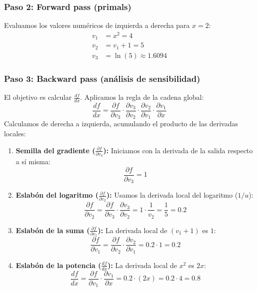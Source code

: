 \documentclass[12pt,a4paper,openany,oneside]{book}
\begin{document}
\begin{center}
\end{center}

\subsubsection{Paso 2: Forward pass (primals)}
Evaluamos los valores numéricos de izquierda a derecha para $x = 2$:
\begin{align*}
v_1 &= x^2 = 4 \\
v_2 &= v_1 + 1 = 5 \\
v_3 &= \ln(5) \approx 1.6094
\end{align*}

\subsubsection{Paso 3: Backward pass (análisis de sensibilidad)}
El objetivo es calcular $\frac{df}{dx}$. Aplicamos la regla de la cadena global:
\[
\frac{df}{dx} = \frac{\partial f}{\partial v_3} \cdot \frac{\partial v_3}{\partial v_2} \cdot \frac{\partial v_2}{\partial v_1} \cdot \frac{\partial v_1}{\partial x}
\]
Calculamos de derecha a izquierda, acumulando el producto de las derivadas locales:

\begin{enumerate}
    \item \textbf{Semilla del gradiente ($\frac{\partial f}{\partial v_3}$):} 
    Iniciamos con la derivada de la salida respecto a sí misma:
    \[
    \frac{\partial f}{\partial v_3} = 1
    \]

    \item \textbf{Eslabón del logaritmo ($\frac{\partial f}{\partial v_2}$):}
    Usamos la derivada local del logaritmo ($1/u$):
    \[
    \frac{\partial f}{\partial v_2} = \frac{\partial f}{\partial v_3} \cdot \frac{\partial v_3}{\partial v_2} = 1 \cdot \frac{1}{v_2} = \frac{1}{5} = 0.2
    \]

    \item \textbf{Eslabón de la suma ($\frac{\partial f}{\partial v_1}$):}
    La derivada local de $(v_1 + 1)$ es $1$:
    \[
    \frac{\partial f}{\partial v_1} = \frac{\partial f}{\partial v_2} \cdot \frac{\partial v_2}{\partial v_1} = 0.2 \cdot 1 = 0.2
    \]

    \item \textbf{Eslabón de la potencia ($\frac{df}{dx}$):}
    La derivada local de $x^2$ es $2x$:
    \[
    \frac{df}{dx} = \frac{\partial f}{\partial v_1} \cdot \frac{\partial v_1}{\partial x} = 0.2 \cdot (2x) = 0.2 \cdot 4 = \mathbf{0.8}
    \]
\end{enumerate}
\end{document}
